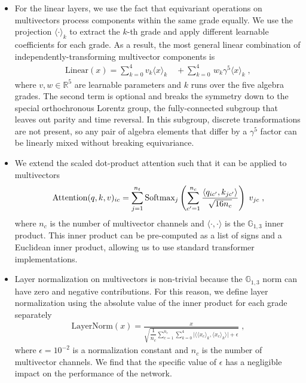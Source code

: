\documentclass[submission, Phys]{SciPost}
\begin{document}
\begin{itemize}
\item For the linear layers, we use the fact that equivariant operations on multivectors process components within the same grade equally. We use the projection $\langle \cdot\rangle_k$ to extract the $k$-th grade and apply different learnable coefficients for each grade. As a result, the most general linear combination of independently-transforming multivector components is
%
\begin{align}
    \text{Linear} (x) = \sum_{k=0}^{4} v_k \langle x \rangle_k \quad+ \sum_{k=0}^{4} \, w_k \gamma^5 \langle x \rangle_k 
    \label{eq:linear} \; ,
\end{align}
%
where $v, w\in \mathbb{R}^5$ are learnable parameters  and $k$ runs over the five algebra grades. The second term is optional and breaks the symmetry down to the special orthochronous Lorentz group, the fully-connected subgroup that leaves out parity and time reversal. In this subgroup, discrete transformations are not present, so any pair of algebra elements that differ by a $\gamma^5$ factor can be linearly mixed without breaking equivariance.

\item We extend the scaled dot-product attention such that it can be applied to multivectors 
%
\begin{align}
    \operatorname{Attention}(q, k, v)_{ic} = \sum_{j=1}^{n_t} \text{Softmax}_j \left( \sum_{c'=1}^{n_c}\frac {\langle q_{ic'}, k_{jc'}\rangle} {\sqrt{16n_c}} \right) \; v_{jc} \; ,
\end{align}
%
where $n_c$ is the number of multivector channels and $\langle \cdot , \cdot\rangle$ is the $\mathbb{G}_{1,3}$ inner product. This inner product can be pre-computed as a list of signs and a Euclidean inner product, allowing us to use standard transformer implementations.

\item Layer normalization on multivectors is non-trivial because the $\mathbb{G}_{1,3}$ norm can have zero and negative contributions. For this reason, we define layer normalization using the absolute value of the inner product for each grade separately
%
\begin{align}
    \text{LayerNorm} (x) = \frac{x}{\sqrt{ \dfrac{1}{n_c} \sum_{c=1}^{n_c} \sum_{k=0}^4 \Big\rvert \Big\langle \langle x_c \rangle_k, \langle x_c\rangle_k \Big\rangle \Big\rvert + \epsilon}} \; ,
\end{align}
%
where $\epsilon=10^{-2}$ is a normalization constant and $n_c$ is the number of multivector channels. We find that the specific value of $\epsilon$ has a negligible impact on the performance of the network.


\end{itemize}
\end{document}
